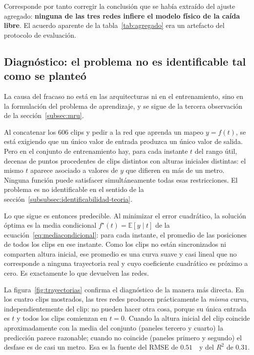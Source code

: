 \documentclass[titlepage,11pt]{article}
\providecommand{\num}[1]{\ensuremath{#1}}
\begin{document}
Corresponde por tanto corregir la conclusión que se había extraído del ajuste
agregado: \textbf{ninguna de las tres redes infiere el modelo físico de la
caída libre}. El acuerdo aparente de la tabla~\ref{tab:agregado} era un
artefacto del protocolo de evaluación.

\subsection{Diagnóstico: el problema no es identificable tal como se planteó}
\label{subsec:identificabilidad}

La causa del fracaso no está en las arquitecturas ni en el entrenamiento, sino
en la formulación del problema de aprendizaje, y se sigue de la tercera
observación de la sección~\ref{subsec:mru}.

Al concatenar los 606 clips y pedir a la red que aprenda un mapeo $y=f(t)$, se
está exigiendo que un único valor de entrada produzca un único valor de salida.
Pero en el conjunto de entrenamiento hay, para cada instante $t$ del rango
útil, decenas de puntos procedentes de clips distintos con alturas iniciales
distintas: el mismo $t$ aparece asociado a valores de $y$ que difieren en más
de un metro. Ninguna función puede satisfacer simultáneamente todas esas
restricciones. El problema es no identificable en el sentido de la
sección~\ref{subsubsec:identificabilidad-teoria}.

Lo que sigue es entonces predecible. Al minimizar el error cuadrático, la
solución óptima es la media condicional
$f^\star(t)=\mathbb{E}[y\mid t]$ de la
ecuación~\eqref{eq:mediacondicional}: para cada instante, el promedio de las
posiciones de todos los clips en ese instante. Como los clips no están
sincronizados ni comparten altura inicial, ese promedio es una curva suave y
casi lineal que no corresponde a ninguna trayectoria real y cuyo coeficiente
cuadrático es próximo a cero. Es exactamente lo que devuelven las redes.

La figura~\ref{fig:trayectorias} confirma el diagnóstico de la manera más
directa. En los cuatro clips mostrados, las tres redes producen prácticamente
la \emph{misma} curva, independientemente del clip: no pueden hacer otra cosa,
porque su única entrada es $t$ y todos los clips comienzan en $t=0$. Cuando la
altura inicial del clip coincide aproximadamente con la media del conjunto
(paneles tercero y cuarto) la predicción parece razonable; cuando no coincide
(paneles primero y segundo) el desfase es de casi un metro. Esa es la fuente
del RMSE de \num{0.51}~\meter\ y del $R^2$ de \num{0.31}.
\end{document}
